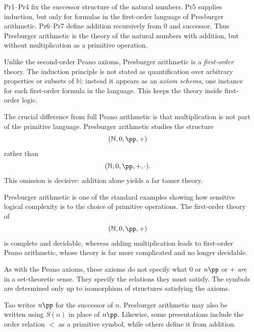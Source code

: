 \begin{remark}
Pr1--Pr4 fix the successor structure of the natural numbers.
Pr5 supplies induction, but only for formulas in the
first-order language of Presburger arithmetic.
Pr6--Pr7 define addition recursively from $0$ and successor.
Thus Presburger arithmetic is the theory of the natural numbers
with addition, but without multiplication as a primitive operation.
\end{remark}

\begin{remark}
Unlike the second-order Peano axioms, Presburger arithmetic is a
\emph{first-order} theory. The induction principle is not stated as
quantification over arbitrary properties or subsets of
$\mathbb{N}$; instead it appears as an \emph{axiom schema}, one
instance for each first-order formula in the language.
This keeps the theory inside first-order logic.
\end{remark}

\begin{remark}
The crucial difference from full Peano arithmetic is that
multiplication is not part of the primitive language.
Presburger arithmetic studies the structure
\[
(\mathbb{N},0,\pp,+)
\]
rather than
\[
(\mathbb{N},0,\pp,+,\cdot).
\]
This omission is decisive: addition alone yields a far tamer theory.
\end{remark}

\begin{remark}
Presburger arithmetic is one of the standard examples showing how
sensitive logical complexity is to the choice of primitive
operations. The first-order theory of
\[
(\mathbb{N},0,\pp,+)
\]
is complete and decidable, whereas adding multiplication leads to
first-order Peano arithmetic, whose theory is far more complicated
and no longer decidable.
\end{remark}

\begin{remark}
As with the Peano axioms, these axioms do not specify what $0$ or
$n\pp$ or $+$ \emph{are} in a set-theoretic sense. They specify the
relations they must satisfy. The symbols are determined only up to
isomorphism of structures satisfying the axioms.
\end{remark}

\begin{remark}[Notation]
Tao writes $n\pp$ for the successor of $n$.
Presburger arithmetic may also be written using $S(n)$ in place of
$n\pp$. Likewise, some presentations include the order relation
$<$ as a primitive symbol, while others define it from addition.
\end{remark}